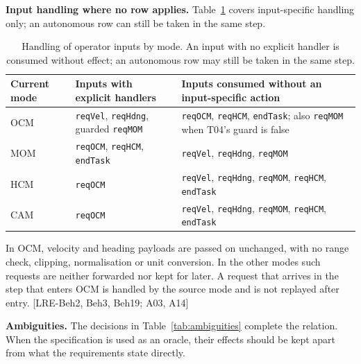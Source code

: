 \documentclass[
  10pt,
]{article}
\begin{document}
\textbf{Input handling where no row applies.} Table~\ref{tab:inputs} covers
input-specific handling only; an autonomous row can still be taken in
the same step.

\begin{longtable}[]{@{}
  >{\raggedright\arraybackslash}p{}
  >{\raggedright\arraybackslash}p{}
  >{\raggedright\arraybackslash}p{}@{}}
\caption{Handling of operator inputs by mode. An input with no explicit handler is consumed without effect; an autonomous row may still be taken in the same step.}\label{tab:inputs}\\
\toprule\noalign{}
\begin{minipage}[b]{\linewidth}\raggedright
Current mode
\end{minipage} & \begin{minipage}[b]{\linewidth}\raggedright
Inputs with explicit handlers
\end{minipage} & \begin{minipage}[b]{\linewidth}\raggedright
Inputs consumed without an input-specific action
\end{minipage} \\
\midrule\noalign{}
\endhead
\bottomrule\noalign{}
\endlastfoot
OCM & \texttt{reqVel}, \texttt{reqHdng}, guarded \texttt{reqMOM} &
\texttt{reqOCM}, \texttt{reqHCM}, \texttt{endTask}; also \texttt{reqMOM}
when T04's guard is false \\
MOM & \texttt{reqOCM}, \texttt{reqHCM}, \texttt{endTask} &
\texttt{reqVel}, \texttt{reqHdng}, \texttt{reqMOM} \\
HCM & \texttt{reqOCM} & \texttt{reqVel}, \texttt{reqHdng},
\texttt{reqMOM}, \texttt{reqHCM}, \texttt{endTask} \\
CAM & \texttt{reqOCM} & \texttt{reqVel}, \texttt{reqHdng},
\texttt{reqMOM}, \texttt{reqHCM}, \texttt{endTask} \\
\end{longtable}

In OCM, velocity and heading payloads are passed on unchanged, with no
range check, clipping, normalisation or unit conversion. In the other
modes such requests are neither forwarded nor kept for later. A request
that arrives in the step that enters OCM is handled by the source mode
and is not replayed after entry. {[}LRE-Beh2, Beh3, Beh19; A03, A14{]}

\textbf{Ambiguities.} The decisions in Table~\ref{tab:ambiguities} complete the relation. When
the specification is used as an oracle, their effects should be kept
apart from what the requirements state directly.
\end{document}
